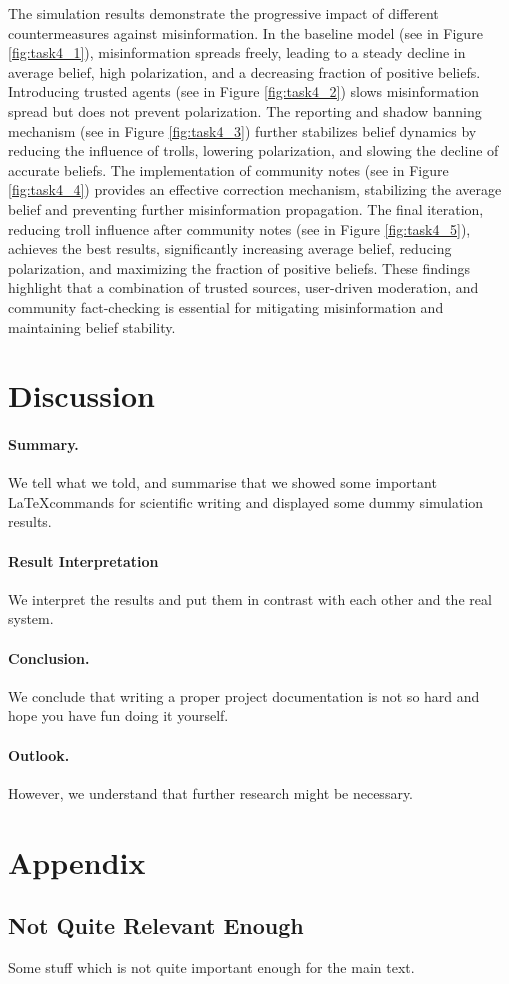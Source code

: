 \documentclass[a4paper,11pt]{scrartcl}
\begin{document}
The simulation results demonstrate the progressive impact of different countermeasures against misinformation. In the baseline model (see in Figure \ref{fig:task4_1}), misinformation spreads freely, leading to a steady decline in average belief, high polarization, and a decreasing fraction of positive beliefs. Introducing trusted agents (see in Figure \ref{fig:task4_2}) slows misinformation spread but does not prevent polarization. The reporting and shadow banning mechanism (see in Figure \ref{fig:task4_3}) further stabilizes belief dynamics by reducing the influence of trolls, lowering polarization, and slowing the decline of accurate beliefs. The implementation of community notes (see in Figure \ref{fig:task4_4}) provides an effective correction mechanism, stabilizing the average belief and preventing further misinformation propagation. The final iteration, reducing troll influence after community notes (see in Figure \ref{fig:task4_5}), achieves the best results, significantly increasing average belief, reducing polarization, and maximizing the fraction of positive beliefs. These findings highlight that a combination of trusted sources, user-driven moderation, and community fact-checking is essential for mitigating misinformation and maintaining belief stability.

\section{Discussion}
\paragraph{Summary.} We tell what we told, and summarise that we showed some important \LaTeX commands for scientific writing and displayed some dummy simulation results.
\paragraph{Result Interpretation}
We interpret the results and put them in contrast with each other and the real system. 
\paragraph{Conclusion.} We conclude that writing a proper project documentation is not so hard and hope you have fun doing it yourself. 
\paragraph{Outlook.} However, we understand that further research might be necessary.
\newpage




\appendix
\section{Appendix}
\subsection{Not Quite Relevant Enough}
Some stuff which is not quite important enough for the main text.
\end{document}
